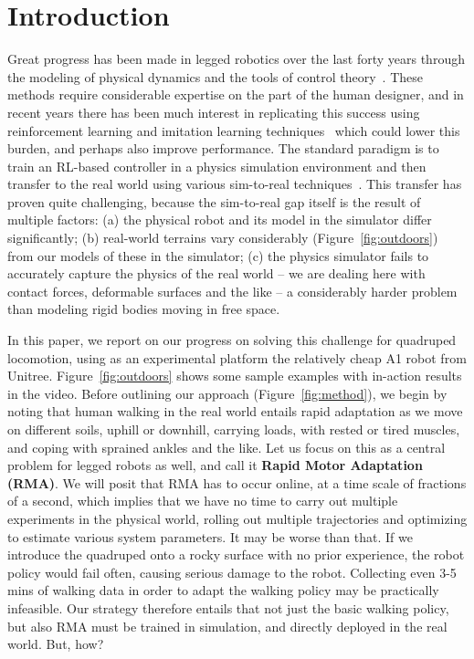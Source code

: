 \documentclass[conference]{IEEEtran}
\begin{document}
\section{Introduction}
\label{sec:introduction}
Great progress has been made in legged robotics over the last forty years through the modeling of physical dynamics and  the tools of control theory~\cite{miura1984dynamic,raibert1984hopping,saranli2001rhex,geyer2003positive,yin2007simbicon,zucker2010optimization,sreenath2011compliant,johnson2012tail,khoramshahi2013piecewise,ames2014rapidly,hyun2016implementation}. These methods require considerable expertise on the part of the human designer, and in recent years there has been much interest in replicating this success using reinforcement learning and imitation learning techniques~\cite{hwangbo2019learning,haarnoja2019learningtowalk,peng2020learning,yang2020data,lee2020learning} which could lower this burden, and perhaps also improve performance. The standard paradigm is to train an RL-based controller in a physics simulation environment and then transfer to the real world using various sim-to-real techniques~\cite{tobin2017domain,peng2018sim,hwangbo2019learning}.  This transfer has proven quite challenging, because the sim-to-real gap itself is the result of multiple factors: (a) the physical robot and its model in the simulator differ significantly; (b) real-world terrains vary considerably (Figure~\ref{fig:outdoors}) from our models of these in the simulator; (c) the physics simulator fails to accurately capture the physics of the real world – we are dealing here with contact forces, deformable surfaces and the like – a considerably harder problem than modeling rigid bodies moving in free space.

In this paper, we report on our progress on solving this challenge for quadruped locomotion, using as  an experimental platform the relatively cheap A1 robot from Unitree. Figure~\ref{fig:outdoors} shows some sample examples with in-action results in the video. Before outlining our approach (Figure~\ref{fig:method}), we begin by noting that human walking in the real world entails rapid adaptation as we move on different soils, uphill or downhill, carrying loads, with rested or tired muscles, and coping with sprained ankles and the like. Let us focus on this as a central problem for legged robots as well, and call it {\bf Rapid Motor Adaptation (RMA)}. We will posit that RMA has to occur online, at a time scale of fractions of a second, which implies that we have no time to carry out multiple experiments in the physical world, rolling out multiple trajectories and optimizing to estimate various system parameters.
It may be worse than that.  If we  introduce the quadruped onto a  rocky surface  with no prior experience, the robot policy would  fail often, causing serious damage to the robot. Collecting even 3-5 mins of walking data in order to adapt the walking policy may be practically infeasible. Our strategy therefore entails that not just the basic walking policy, but also RMA must be trained in simulation, and directly deployed in the real world. But, how?
\end{document}
